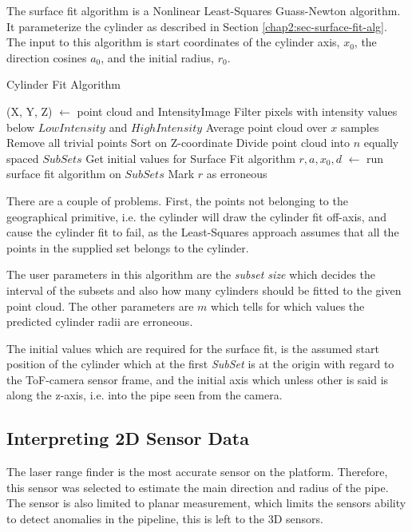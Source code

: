 The surface fit algorithm is a Nonlinear Least-Squares Guass-Newton algorithm. It parameterize the
cylinder as described in Section \ref{chap2:sec-surface-fit-alg}. The input to this
algorithm is start coordinates of the cylinder axis, $x_0$, the direction cosines $a_0$, and
the initial radius, $r_0$.

\begin{algorithm}[htbp]
    \caption{Cylinder Fit Algorithm}
    \label{chap5:alg-cylinderfit}
    \begin{algorithmic}
        \REQUIRE (X, Y, Z) $\leftarrow$ point cloud and IntensityImage
        \STATE Filter pixels with intensity values below $LowIntensity$ and $HighIntensity$
        \STATE Average point cloud over $x$ samples
        \STATE Remove all trivial points
        \STATE Sort on Z-coordinate
        \STATE Divide point cloud into $n$ equally spaced $SubSets$
            \STATE Get initial values for Surface Fit algorithm
            \STATE  $r, a, x_0, d$ $\leftarrow$ run surface fit algorithm on $SubSets$
        \ENDFOR
                \STATE Mark $r$ as erroneous
            \ENDIF
        \ENDFOR
    \end{algorithmic}
\end{algorithm}

There are a couple of problems. First, the points not belonging to the geographical
primitive, i.e. the cylinder will draw the cylinder fit off-axis, and cause the cylinder
fit to fail, as the Least-Squares approach assumes that all the points in the supplied set
belongs to the cylinder. 

The user parameters in this algorithm are the \emph{subset size} which decides the interval
of the subsets and also how many cylinders should be fitted to the given point cloud. The
other parameters are $m$ which tells for which values the predicted cylinder radii are
erroneous. 

The initial values which are required for the surface fit, is the assumed start position
of the cylinder which at the first \emph{SubSet} is at the origin with regard to the
ToF-camera sensor frame, and the initial axis which unless other is said is along the
z-axis, i.e. into the pipe seen from the camera.


\subsection{Interpreting 2D Sensor Data}
The laser range finder is the most accurate sensor on the platform. Therefore, this
sensor was selected to estimate the main direction and radius of the pipe. The sensor is
also limited to planar measurement, which limits the sensors ability to detect anomalies
in the pipeline, this is left to the 3D sensors. 

